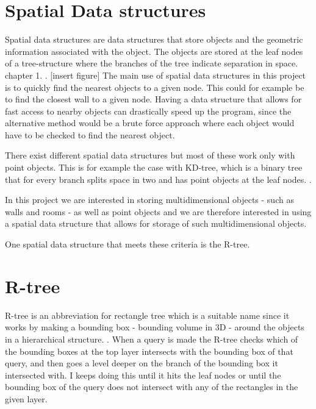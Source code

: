 \section{Spatial Data structures}
Spatial data structures are data structures that store objects and the geometric information associated with the object. The objects are stored at the leaf nodes of a tree-structure where the branches of the tree indicate separation in space. chapter 1. \cite{laurini1992fundamentals}. [insert figure] %
The main use of spatial data structures in this project is to quickly find the nearest objects to a given node. This could for example be to find the closest wall to a given node. Having a data structure that allows for fast access to nearby objects can drastically speed up the program, since the alternative method would be a brute force approach where each object would have to be checked to find the nearest object.


There exist different spatial data structures but most of these work only with point objects. This is for example the case with  KD-tree, which is a binary tree that for every branch splits space in two and has point objects at the leaf nodes. \cite{bentley1975binarysearch}. 

In this project we are interested in storing multidimensional objects - such as walls and rooms - as well as point objects and we are therefore interested in using a spatial data structure that allows for storage of such multidimensional objects.

One spatial data structure that meets these criteria is the R-tree.


\section{R-tree}
R-tree is an abbreviation for rectangle tree which is a suitable name since it works by making a bounding box - bounding volume in 3D - around the objects in a hierarchical structure. \cite{guttman1984r}. When a query is made the R-tree checks which of the bounding boxes at the top layer intersects with the bounding box of that query, and then goes a level deeper on the branch of the bounding box it intersected with. I keeps doing this until it hits the leaf nodes or until the bounding box of the query does not intersect with any of the rectangles in the given layer.
 
